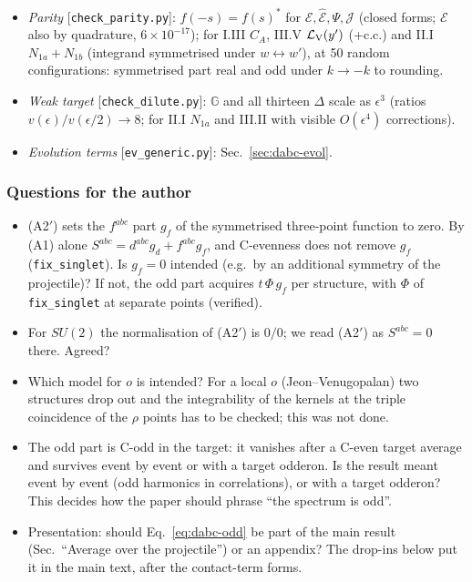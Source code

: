 \documentclass[10pt]{article}
\def\mf#1{\mathbb{#1}}
\begin{document}
\begin{itemize}
\item \emph{Parity} [\texttt{check\_parity.py}]: $f(-s)=f(s)^{*}$ for $\mathcal{E},\widehat{\mathcal{E}},\Psi,\mathcal{J}$ (closed forms; $\mathcal{E}$ also by quadrature, $6\times10^{-17}$); for I.III $C_{A}$, III.V $\mathcal{L}_{\rm V}(y')$ (+c.c.) and II.I $N_{1a}+N_{1b}$ (integrand symmetrised under $w\leftrightarrow w'$), at 50 random configurations: symmetrised part real and odd under $k\to-k$ to rounding.
\item \emph{Weak target} [\texttt{check\_dilute.py}]: $\mf{G}$ and all thirteen $\Delta$ scale as $\epsilon^{3}$ (ratios $v(\epsilon)/v(\epsilon/2)\to8$; for II.I $N_{1a}$ and III.II with visible $O(\epsilon^{4})$ corrections).
\item \emph{Evolution terms} [\texttt{ev\_generic.py}]: Sec.~\ref{sec:dabc-evol}.
\end{itemize}

\subsubsection{Questions for the author}\label{sec:dabc-q}
\begin{itemize}
\item[(Q1)] (A2$'$) sets the $f^{abc}$ part $g_{f}$ of the symmetrised three-point function to zero. By (A1) alone $S^{abc}=d^{abc}g_{d}+f^{abc}g_{f}$, and C-evenness does not remove $g_{f}$ (\texttt{fix\_singlet}). Is $g_{f}=0$ intended (e.g.\ by an additional symmetry of the projectile)? If not, the odd part acquires $t\,\Phi\,g_{f}$ per structure, with $\Phi$ of \texttt{fix\_singlet} at separate points (verified).
\item[(Q2)] For $SU(2)$ the normalisation of (A2$'$) is $0/0$; we read (A2$'$) as $S^{abc}=0$ there. Agreed?
\item[(Q3)] Which model for $o$ is intended? For a local $o$ (Jeon--Venugopalan) two structures drop out and the integrability of the kernels at the triple coincidence of the $\rho$ points has to be checked; this was not done.
\item[(Q4)] The odd part is C-odd in the target: it vanishes after a C-even target average and survives event by event or with a target odderon. Is the result meant event by event (odd harmonics in correlations), or with a target odderon? This decides how the paper should phrase ``the spectrum is odd''.
\item[(Q5)] Presentation: should Eq.~\eqref{eq:dabc-odd} be part of the main result (Sec.~``Average over the projectile'') or an appendix? The drop-ins below put it in the main text, after the contact-term forms.
\end{itemize}
\end{document}
